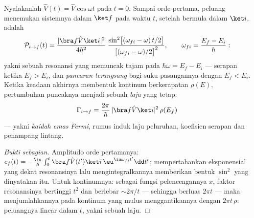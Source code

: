 \begin{theorem}\label{thm:b3:perturbation-theory:golden}
Nyalakanlah $\hat V(t) = \hat V\cos\omega t$ pada $t = 0$. Sampai orde
pertama, peluang menemukan sistemnya dalam $\ket f$ pada waktu $t$,
setelah bermula dalam $\ket i$, adalah
\[
\mathcal P_{i\to f}(t) = \frac{|\bra f\hat V\ket i|^2}{4\hbar^2}\;
\frac{\sin^2\!\big[(\omega_{fi} - \omega)\,t/2\big]}
{\big[(\omega_{fi} - \omega)/2\big]^2} ,
\qquad \omega_{fi} = \frac{E_f - E_i}{\hbar} :
\]
yakni sebuah resonansi yang memuncak tajam pada
$\hbar\omega = E_f - E_i$ --- serapan ketika $E_f > E_i$, dan
\emph{pancaran terangsang} bagi suku pasangannya dengan $E_f < E_i$.
Ketika keadaan akhirnya membentuk kontinum berkerapatan $\rho(E)$,
pertumbuhan puncaknya menjadi sebuah \emph{laju} yang tetap:
\[
\Gamma_{i\to f} = \frac{2\pi}{\hbar}\,
|\bra f\hat V\ket i|^2\,\rho(E_f)
\]
--- yakni \emph{kaidah emas Fermi}, rumus induk laju peluruhan,
koefisien serapan dan penampang lintang.
\end{theorem}

\begin{proof}[Bukti sebagian]
Amplitudo orde pertamanya: $c_f(t) = -\tfrac{\iu}{\hbar}\int_0^t\bra
f\hat V(t')\ket i\,\eu^{\iu\omega_{fi}t'}\dd t'$; mempertahankan
eksponensial yang dekat resonansinya lalu mengintegralkannya memberikan
bentuk $\sin^2$ yang dinyatakan itu. Untuk kontinumnya: sebagai fungsi
pelencengannya $x$, faktor resonansinya bertinggi $t^2$ dan berlebar
$\sim 2\pi/t$ --- sehingga berluas $2\pi t$ --- maka menjumlahkannya
pada kontinum yang mulus menggantikannya dengan $2\pi t\,\rho$:
peluangnya linear dalam $t$, yakni sebuah laju.
\end{proof}

